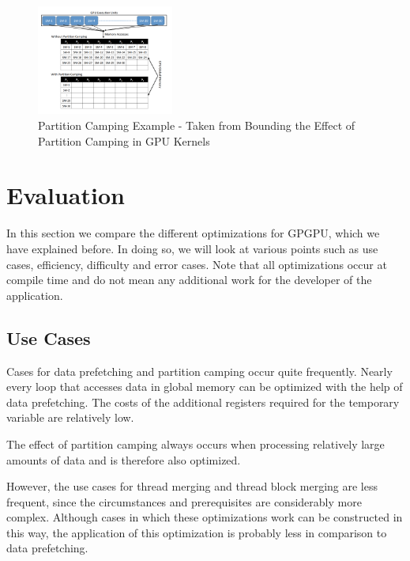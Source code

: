 \documentclass[conference]{IEEEtran}
\begin{document}
		\begin{figure}[htbp]
			\centerline{\includegraphics[width=0.4\textwidth]{PartitionCamping.png}}
			\caption{Partition Camping Example - Taken from Bounding the Effect of Partition Camping in GPU Kernels}
			\label{fig2}
		\end{figure}

\section{Evaluation}

	
	In this section we compare the different optimizations for GPGPU, which we have explained before. In doing so, we will look at various points such as use cases, efficiency, difficulty and error cases. Note that all optimizations occur at compile time and do not mean any additional work for the developer of the application.
	
	\subsection{Use Cases}
		Cases for data prefetching and partition camping occur quite frequently. Nearly every loop that accesses data in global memory can be optimized with the help of data prefetching.  The costs of the additional registers required for the temporary variable are relatively low.
		
		The effect of partition camping always occurs when processing relatively large amounts of data and is therefore also optimized.
		
		However, the use cases for thread merging and thread block merging are less frequent, since the circumstances and prerequisites are considerably more complex. Although cases in which these optimizations work can be constructed in this way, the application of this optimization is probably less in comparison to data prefetching.
		
\end{document}
